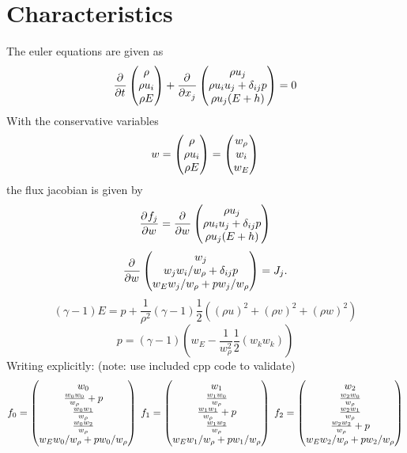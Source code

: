 \documentclass[12pt]{article}
\numberwithin{equation}{section}
\numberwithin{figure}{section}
\begin{document}
\section{Characteristics}
The euler equations are given as
\begin{equation*}
\frac{\partial^{} }{\partial t^{}}\begin{pmatrix} \rho \\ \rho u_i \\ \rho E \end{pmatrix} + \frac{\partial^{} }{\partial x_j^{}}\begin{pmatrix} \rho u_j \\ \rho u_i u_j + \delta_{ij}p \\ \rho u_j (E + h) \end{pmatrix} = 0
\end{equation*}
With the conservative variables
\begin{equation}
w = \begin{pmatrix} \rho \\ \rho u_i \\ \rho E \end{pmatrix} = \begin{pmatrix} w_\rho \\ w_i \\ w_E \end{pmatrix}
\end{equation}
the flux jacobian is given by
\begin{equation*}
\frac{\partial^{} f_j}{\partial w^{}} = \frac{\partial^{} }{\partial w^{}}\begin{pmatrix} \rho u_j \\ \rho u_i u_j + \delta_{ij}p \\ \rho u_j (E + h) \end{pmatrix}
\end{equation*}
\begin{equation}
\frac{\partial^{} }{\partial w^{}}\begin{pmatrix} w_j \\ w_j w_i / w_\rho + \delta_{ij}p \\ w_E w_j / w_\rho + p w_j/w_\rho  \end{pmatrix}
= J_j.
\end{equation}
\begin{equation}
(\gamma - 1) E = p + \frac{1}{\rho ^ 2}(\gamma - 1)\frac{1}{2}((\rho u)^2 + (\rho v)^2 + (\rho w)^2)
\end{equation}
\begin{equation}
p = (\gamma - 1)\left(w_E - \frac{1}{w_\rho ^ 2}\frac{1}{2}\left(w_kw_k\right)\right)
\end{equation}
Writing explicitly: (note: use included cpp code to validate)
\begin{equation*}
f_0 = \begin{pmatrix}  w_0 \\ \frac{w_0w_0}{w_\rho} + p \\ \frac{w_0w_1}{w_\rho} \\ \frac{w_0w_2}{w_\rho} \\ w_E w_0 / w_\rho + p w_0/w_\rho \end{pmatrix}
\hspace{1mm}
f_1 = \begin{pmatrix}  w_1 \\ \frac{w_1w_0}{w_\rho} \\ \frac{w_1w_1}{w_\rho} + p \\ \frac{w_1w_2}{w_\rho} \\ w_E w_1 / w_\rho + p w_1/w_\rho \end{pmatrix}
\hspace{1mm}
f_2 = \begin{pmatrix}  w_2 \\ \frac{w_2w_0}{w_\rho} \\ \frac{w_2w_1}{w_\rho} \\ \frac{w_2w_2}{w_\rho} +p \\ w_E w_2 / w_\rho + p w_2/w_\rho \end{pmatrix}
\end{equation*}
\end{document}
